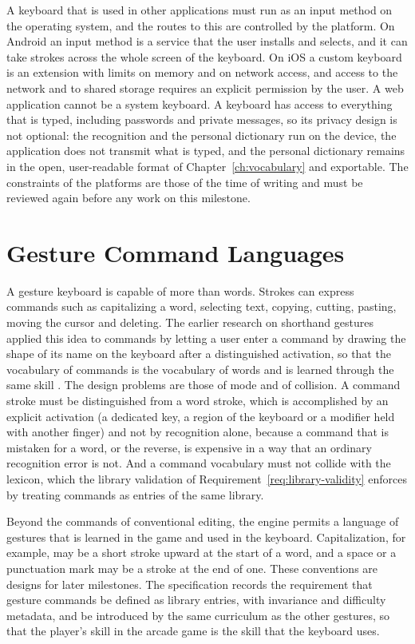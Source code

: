 A keyboard that is used in other applications must run as an input method on the operating system, and the routes to this are controlled by the platform. On Android an input method is a service that the user installs and selects, and it can take strokes across the whole screen of the keyboard. On iOS a custom keyboard is an extension with limits on memory and on network access, and access to the network and to shared storage requires an explicit permission by the user. A web application cannot be a system keyboard. A keyboard has access to everything that is typed, including passwords and private messages, so its privacy design is not optional: the recognition and the personal dictionary run on the device, the application does not transmit what is typed, and the personal dictionary remains in the open, user-readable format of Chapter~\ref{ch:vocabulary} and exportable. The constraints of the platforms are those of the time of writing and must be reviewed again before any work on this milestone.\evS

\chapter{Gesture Command Languages}\label{ch:command-languages}

A gesture keyboard is capable of more than words. Strokes can express commands such as capitalizing a word, selecting text, copying, cutting, pasting, moving the cursor and deleting. The earlier research on shorthand gestures applied this idea to commands by letting a user enter a command by drawing the shape of its name on the keyboard after a distinguished activation, so that the vocabulary of commands is the vocabulary of words and is learned through the same skill \cite{kristensson2007command}.\evD{} The design problems are those of mode and of collision. A command stroke must be distinguished from a word stroke, which is accomplished by an explicit activation (a dedicated key, a region of the keyboard or a modifier held with another finger) and not by recognition alone, because a command that is mistaken for a word, or the reverse, is expensive in a way that an ordinary recognition error is not. And a command vocabulary must not collide with the lexicon, which the library validation of Requirement~\ref{req:library-validity} enforces by treating commands as entries of the same library.

Beyond the commands of conventional editing, the engine permits a language of gestures that is learned in the game and used in the keyboard. Capitalization, for example, may be a short stroke upward at the start of a word, and a space or a punctuation mark may be a stroke at the end of one. These conventions are designs for later milestones. The specification records the requirement that gesture commands be defined as library entries, with invariance and difficulty metadata, and be introduced by the same curriculum as the other gestures, so that the player's skill in the arcade game is the skill that the keyboard uses.

